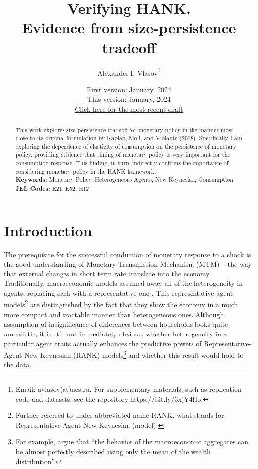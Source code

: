 \documentclass[12pt]{article}
\title{Verifying HANK.\\ Evidence from size-persistence tradeoff}
\author{Alexander I. Vlasov\thanks{Email: avlasov(at)nes.ru. For supplementary materials, such as replication code and datasets, see the repository \href{https://bit.ly/3xjY4Ho}{https://bit.ly/3xjY4Ho}.}}
\date{\normalsize First version: January, 2024\\\vspace{1ex} This version: January, 2024\\ \vspace{1ex}
\href{}{Click here for the most recent draft}}
\numberwithin{equation}{section}
\begin{document}
{}
\maketitle



\begin{abstract}
    \noindent This work explores size-persistence tradeoff for monetary policy in the manner most close to its original formulation by Kaplan, Moll, and Violante (2018). 
    Specifically I am exploring the dependence of elasticity of consumption on the persistence of monetary policy. providing evidence that timing of monetary policy is very important for the consumption response. This finding, in turn, indirectly confirms the importance of considering monetary policy in the HANK framework.
    \\
    \noindent\textbf{Keywords:} Monetary Policy, Heterogeneous Agents, New Keynesian, Consumption
    \\
    \noindent\textbf{JEL Codes:} E21, E52, E12 \\
    \bigskip
\end{abstract}

\section{Introduction}

The prerequisite for the successful conduction of monetary response to a shock is the good understanding of Monetary Transmission Mechanism (MTM) -- the way that external changes in short term rate translate into the economy. 
Traditionally, macroeconomic models assumed away all of the heterogeneity in agents, replacing each with a representative one \cite{Gali2018}.
This representative agent models\footnote{Further referred to under abbreviated name RANK, what stands for Representative Agent New Keynesian (model).} are distinguished by the fact that they show the economy in a much more compact and tractable manner than heterogeneous ones.
Although, assumption of insignificance of differences between households looks quite unrealistic, it is still not immediately obvious, whether heterogeneity in a particular agent traits actually enhances the predictive powers of Representative-Agent New Keynesian (RANK) models\footnote{For example, \citet{Krusell1998} argue that  ``the behavior of the macroeconomic aggregates can be almost perfectly described using only the mean of the wealth distribution''.} 
and whether this result would hold to the data.
\end{document}
